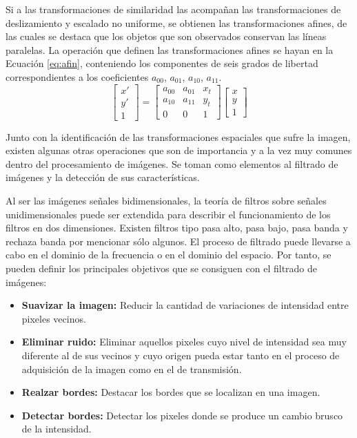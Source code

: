 \par Si a las transformaciones de similaridad las acompañan las transformaciones de deslizamiento y escalado no uniforme, se obtienen las transformaciones afines, de las cuales se destaca que los objetos que son observados conservan las líneas paralelas. La operación que definen las transformaciones afines se hayan en la Ecuación \eqref{eq:afin}, conteniendo los componentes de seis grados de libertad correspondientes a los coeficientes $a_{00}$, $a_{01}$, $a_{10}$, $a_{11}$.
\begin{equation}\label{eq:afin}
	\left[\begin{array}{c}
	x'\\
	y'\\
	1
	\end{array}\right]=
	\left[\begin{array}{ccc}
	a_{00} & a_{01} & x_{t}\\
	a_{10} & a_{11} & y_{t}\\
	0 & 0 & 1
	\end{array}\right]
	\left[\begin{array}{c}
	x\\
	y\\
	1
	\end{array}\right]
\end{equation}
\par Junto con la identificación de las transformaciones espaciales que sufre la imagen, existen algunas otras operaciones que son de importancia y a la vez muy comunes dentro del procesamiento de imágenes. Se toman como elementos al filtrado de imágenes y la detección de sus características.
\par Al ser las imágenes señales bidimensionales, la teoría de filtros sobre señales unidimensionales puede ser extendida para describir el funcionamiento de los filtros en dos dimensiones. Existen filtros tipo pasa alto, pasa bajo, pasa banda y rechaza banda por mencionar sólo algunos. El proceso de filtrado puede llevarse a cabo en el dominio de la frecuencia o en el dominio del espacio. Por tanto, se pueden definir los principales objetivos que se consiguen con el filtrado de imágenes:
\begin{itemize}
	\item {\bf Suavizar la imagen:} Reducir la cantidad de variaciones de intensidad entre pixeles vecinos.
	\item {\bf Eliminar ruido:} Eliminar aquellos pixeles cuyo nivel de intensidad sea muy diferente al de sus vecinos y cuyo origen pueda estar tanto en el proceso de adquisición de la imagen como en el de transmisión.
	\item {\bf Realzar bordes:} Destacar los bordes que se localizan en una imagen.
	\item {\bf Detectar bordes:} Detectar los pixeles donde se produce un cambio brusco de la intensidad.
\end{itemize}
